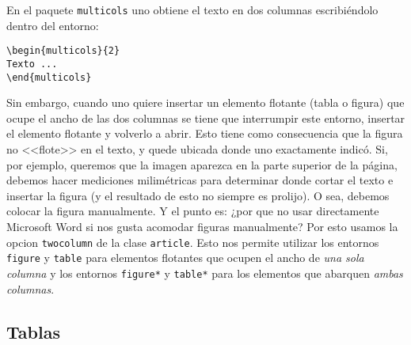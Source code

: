 \documentclass[a4paper,10pt,twocolumn,twoside]{article}
\begin{document}
En el paquete \texttt{multicols} uno obtiene el texto en dos columnas escribiéndolo dentro del entorno:
\begin{Verbatim}[fontsize=\fontsize{7pt}{7pt}\selectfont]
\begin{multicols}{2}
Texto ...
\end{multicols}
\end{Verbatim}
Sin embargo, cuando uno quiere insertar un elemento flotante (tabla o figura) que ocupe el ancho de las dos columnas se tiene que interrumpir este entorno, insertar el elemento flotante y volverlo a abrir. Esto tiene como consecuencia que la figura no <<flote>> en el texto, y quede ubicada donde uno exactamente indicó. Si, por ejemplo, queremos que la imagen aparezca en la parte superior de la página, debemos hacer mediciones milimétricas para determinar donde cortar el texto e insertar la figura (y el resultado de esto no siempre es prolijo). O sea, debemos colocar la figura manualmente. Y el punto es: ¿por que no usar directamente Microsoft Word si nos gusta acomodar figuras manualmente? Por esto usamos la opcion \texttt{twocolumn} de la clase \texttt{article}. Esto nos permite utilizar los entornos \texttt{figure} y \texttt{table} para elementos flotantes que ocupen el ancho de \emph{una sola columna} y los entornos \texttt{figure*} y \texttt{table*} para los elementos que abarquen \emph{ambas columnas}.

\subsection{Tablas}

\begin{table}[b]
    \centering
    \caption{Valores aceptados para la velocidad de la luz y la constante de Boltzmann.}
    \label{tab:tabla_1}
\end{table}
\end{document}
